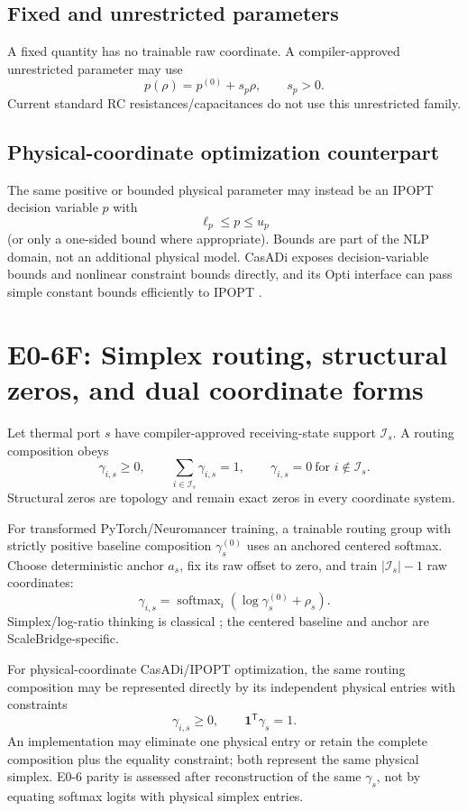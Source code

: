 \documentclass[11pt]{article}
\newcommand{\softmax}{\operatorname{softmax}}
\begin{document}
\subsection{Fixed and unrestricted parameters}
A fixed quantity has no trainable raw coordinate. A compiler-approved
unrestricted parameter may use
\[
\boxed{p(\rho)=p^{(0)}+s_p\rho,\qquad s_p>0.}
\]
Current standard RC resistances/capacitances do not use this unrestricted family.

\subsection{Physical-coordinate optimization counterpart}
The same positive or bounded physical parameter may instead be an IPOPT decision
variable $p$ with
\[
\boxed{\ell_p\le p\le u_p}
\]
(or only a one-sided bound where appropriate). Bounds are part of the NLP domain,
not an additional physical model. CasADi exposes decision-variable bounds and
nonlinear constraint bounds directly, and its Opti interface can pass simple
constant bounds efficiently to IPOPT \cite{CasADiDocs2026}.

\section{E0-6F: Simplex routing, structural zeros, and dual coordinate forms}

Let thermal port $s$ have compiler-approved receiving-state support
$\mathcal I_s$. A routing composition obeys
\[
\gamma_{i,s}\ge0,\qquad
\sum_{i\in\mathcal I_s}\gamma_{i,s}=1,\qquad
\gamma_{i,s}=0\ \text{for }i\notin\mathcal I_s.
\]
Structural zeros are topology and remain exact zeros in every coordinate system.

For transformed PyTorch/Neuromancer training, a trainable routing group with
strictly positive baseline composition $\gamma_s^{(0)}$ uses an anchored
centered softmax. Choose deterministic anchor $a_s$, fix its raw offset to zero,
and train $|\mathcal I_s|-1$ raw coordinates:
\[
\boxed{
\gamma_{i,s}=
\softmax_i(\log\gamma_s^{(0)}+\rho_s).
}
\]
Simplex/log-ratio thinking is classical \cite{Aitchison1982Compositional}; the
centered baseline and anchor are ScaleBridge-specific.

For physical-coordinate CasADi/IPOPT optimization, the same routing composition
may be represented directly by its independent physical entries with constraints
\[
\boxed{\gamma_{i,s}\ge0,\qquad \mathbf 1^{\mathsf T}\gamma_s=1.}
\]
An implementation may eliminate one physical entry or retain the complete
composition plus the equality constraint; both represent the same physical
simplex. E0-6 parity is assessed after reconstruction of the same $\gamma_s$, not
by equating softmax logits with physical simplex entries.
\end{document}
